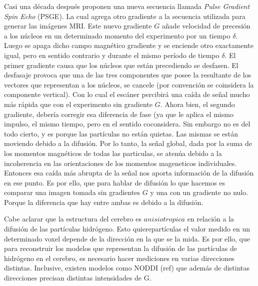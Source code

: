 Casi una d\'ecada despu\'es \citet{Stejskal1965} proponen una nueva secuencia 
llamada \textit{Pulse Gradient Spin Echo} (PSGE). La cual agrega otro
gradiente a la secuencia utilizada para generar las imágenes MRI. Este nuevo 
gradiente $G$ a\~nade velocidad de precesi\'on a los n\'ucleos en un 
determinado momento del experimento por un tiempo $\delta$. Luego se apaga dicho 
campo magn\'etico gradiente y se enciende otro exactamente igual, pero en 
sentido contrario y durante el mismo per\'iodo de tiempo $\delta$. El primer 
gradiente causa que los n\'ucleos que est\'an precediendo se desfasen. 
El desfasaje provoca que una de las tres componentes que posee la resultante de los vectores que 
representan a los n\'ucleos, se cancele (por convenci\'on se coinsidera la componente vertical). Con 
lo cual el escáner percibir\'a una ca\'ida de se\~nal mucho m\'as r\'apida que con el experimento 
sin gradiente $G$. Ahora bien, el segundo gradiente, debería  corregir esa diferencia de fase (ya 
que le aplica el mismo impulso, el mismo tiempo, pero en el sentido coconsidera. Sin embargo no es 
del todo cierto, y es porque las part\'iculas no est\'an quietas. Las mismas se est\'an moviendo 
debido a la difusi\'on. Por lo tanto, la señal global, dada por la suma de los momentos magnéticos 
de todas las particulas, se atenúa debido a la incoherencia en las orientaciones de los momentos mageneticos
individuales. Entonces esa caída más abrupta de la señal nos 
aporta informaci\'on de la difusión en ese punto. Es por ello, que para 
hablar de difusi\'on lo que hacemos es comparar una 
imagen tomada sin gradientes $G$ y una con un gradiente no nulo. Porque la 
diferencia que hay entre ambas es debido a la difusi\'on.



Cabe aclarar que la estructura del cerebro es $anisiotropica$ en relación 
a la difusión de las part\'iculas hidrógeno. Esto quierepartículas el valor 
medido en un determinado voxel depende de la direcci\'on en la que se la mida. 
Es por ello, que para reconstruir los modelos que 
representan la difusi\'on de las partículas de hidrógeno en el cerebro, es 
necesario hacer mediciones en varias direcciones distintas. Inclusive, existen 
modelos como NODDI (ref) que adem\'as de distintas direcciones precisan 
distintas intensidades de G. 

